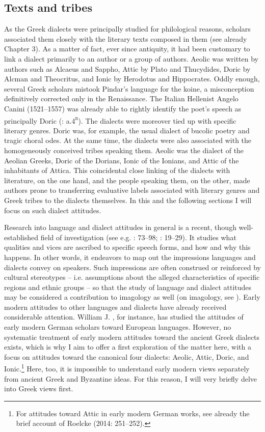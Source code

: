 \subsection{Texts and tribes}
\hypertarget{Toc19704850}{}
As the Greek dialects were principally studied for philological reasons, scholars associated them closely with the literary texts composed in them (see already Chapter 3). As a matter of fact, ever since antiquity, it had been customary to link a dialect primarily to an author or a group of authors. Aeolic was written by authors such as Alcaeus and Sappho, Attic by Plato and Thucydides, Doric by Alcman and Theocritus, and Ionic by Herodotus and Hippocrates. Oddly enough, several Greek scholars mistook Pindar’s language for the koine, a misconception definitively corrected only in the Renaissance. The Italian Hellenist Angelo Canini (1521–1557) was already able to rightly identify the poet’s speech as principally Doric (\citealt{Canini1555}: a.4\textsc{\textsuperscript{r}}). The dialects were moreover tied up with specific literary genres. Doric was, for example, the usual dialect of bucolic poetry and tragic choral odes. At the same time, the dialects were also associated with the homogeneously conceived tribes speaking them. Aeolic was the dialect of the Aeolian Greeks, Doric of the Dorians, Ionic of the Ionians, and Attic of the inhabitants of Attica. This coincidental close linking of the dialects with literature, on the one hand, and the people speaking them, on the other, made authors prone to transferring evaluative labels associated with literary genres and Greek tribes to the dialects themselves. In this and the following sections I will focus on such dialect attitudes.

Research into language and dialect attitudes in general is a recent, though well-established field of investigation (see e.g. \citealt{Edwards2009}: 73–98; \citealt{Garrett2010}: 19–29). It studies what qualities and vices are ascribed to specific speech forms, and how and why this happens. In other words, it endeavors to map out the impressions languages and dialects convey on speakers. Such impressions are often construed or reinforced by cultural stereotypes – i.e. assumptions about the alleged characteristics of specific regions and ethnic groups – so that the study of language and dialect attitudes may be considered a contribution to imagology as well (on imagology, see \citealt{BellerLeerssen2007}). Early modern attitudes to other languages and dialects have already received considerable attention. William J. \citet{Jones1999}, for instance, has studied the attitudes of early modern German scholars toward European languages. However, no systematic treatment of early modern attitudes toward the ancient Greek dialects exists, which is why I aim to offer a first exploration of the matter here, with a focus on attitudes toward the canonical four dialects: Aeolic, Attic, Doric, and Ionic.\footnote{For attitudes toward Attic in early modern German works, see already the brief account of Roelcke (2014: 251–252).} Here, too, it is impossible to understand early modern views separately from ancient Greek and Byzantine ideas. For this reason, I will very briefly delve into Greek views first.

